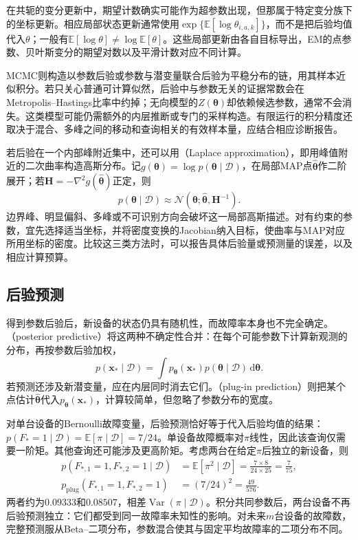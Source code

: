 在共轭的变分更新中，期望计数确实可能作为超参数出现，但那属于特定变分族下的坐标更新。相应局部状态更新通常使用$\exp\{\mathbb{E}[\log\theta_{i,a,k}]\}$，而不是把后验均值代入$\theta$；一般有$\mathbb{E}[\log\theta]\ne\log\mathbb{E}[\theta]$。这些局部更新由各自目标导出，EM的点参数、贝叶斯变分的期望对数以及平滑计数对应不同计算。

MCMC则构造以参数后验或参数与潜变量联合后验为平稳分布的链，用其样本近似积分。若只关心普通可计算似然，后验中与参数无关的证据常数会在Metropolis--Hastings比率中约掉；无向模型的$Z(\bm{\theta})$却依赖候选参数，通常不会消失。这类模型可能仍需额外的内层推断或专门的采样构造。有限运行的积分精度还取决于混合、多峰之间的移动和查询相关的有效样本量，应结合相应诊断报告。

若后验在一个内部峰附近集中，还可以用（Laplace approximation），即用峰值附近的二次曲率构造高斯分布。记$g(\bm{\theta})=\log p(\bm{\theta}\mid\mathcal{D})$，在局部MAP点$\widehat{\bm{\theta}}$作二阶展开；若$\bm{H}=-\nabla^2g(\widehat{\bm{\theta}})$正定，则
\[
  p(\bm{\theta}\mid\mathcal{D})
    \approx\mathcal{N}(\bm{\theta};
          \widehat{\bm{\theta}},\bm{H}^{-1}).
\]
边界峰、明显偏斜、多峰或不可识别方向会破坏这一局部高斯描述。对有约束的参数，宜先选择适当坐标，并将密度变换的Jacobian纳入目标，使曲率与MAP对应所用坐标的密度。比较这三类方法时，可以报告具体后验量或预测量的误差，以及相应计算预算。

\subsection{后验预测}
\label{sec:pgm-parameter-learning-posterior-predictive}

得到参数后验后，新设备的状态仍具有随机性，而故障率本身也不完全确定。（posterior predictive）将这两种不确定性合并：在每个可能参数下计算新观测的分布，再按参数后验加权，
\begin{equation}
  p(\bm{x}_*\mid\mathcal{D})
   =\int p_{\bm{\theta}}(\bm{x}_*)
            p(\bm{\theta}\mid\mathcal{D})\,\mathrm{d}\bm{\theta}.
  \label{eq:pgm-parameter-learning-posterior-predictive}
\end{equation}
若预测还涉及新潜变量，应在内层同时消去它们。（plug-in prediction）则把某个点估计$\widehat{\bm{\theta}}$代入$p_{\bm{\theta}}(\bm{x}_*)$，计算较简单，但忽略了参数分布的宽度。

对单台设备的Bernoulli故障变量，后验预测恰好等于代入后验均值的结果：$p(F_*=1\mid\mathcal{D})=\mathbb{E}[\pi\mid\mathcal{D}]=7/24$。单设备故障概率对$\pi$线性，因此该查询仅需要一阶矩。其他查询还可能涉及更高阶矩。考虑两台在给定$\pi$后独立的新设备，则
\[
  \begin{aligned}
    p(F_{*,1}=1,F_{*,2}=1\mid\mathcal{D})
      &=\mathbb{E}[\pi^2\mid\mathcal{D}]
        =\frac{7\times8}{24\times25}
        =\frac{7}{75},\\
    p_{\mathrm{plug}}(F_{*,1}=1,F_{*,2}=1)
      &=(7/24)^2=\frac{49}{576}.
  \end{aligned}
\]
两者约为$0.09333$和$0.08507$，相差$\operatorname{Var}(\pi\mid\mathcal{D})$。积分共同参数后，两台设备不再后验预测独立：它们都受到同一故障率未知性的影响。对未来$m$台设备的故障数，完整预测服从Beta--二项分布，参数混合使其与固定平均故障率的二项分布不同。


